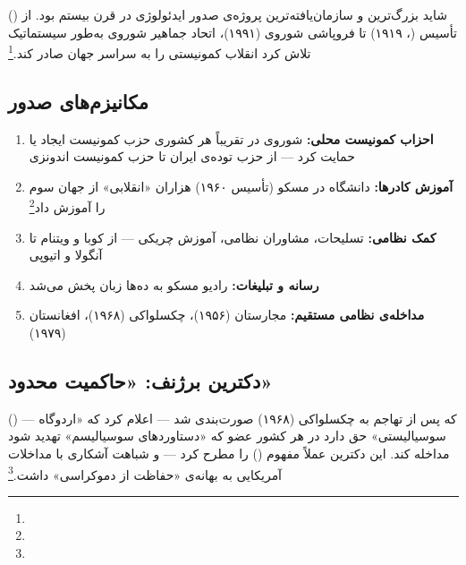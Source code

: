  () شاید بزرگ‌ترین و سازمان‌یافته‌ترین پروژه‌ی صدور ایدئولوژی در قرن بیستم بود. از تأسیس  (، ۱۹۱۹) تا فروپاشی شوروی (۱۹۹۱)، اتحاد جماهیر شوروی به‌طور سیستماتیک تلاش کرد انقلاب کمونیستی را به سراسر جهان صادر کند.\footnote{}

\subsection{مکانیزم‌های صدور}
\label{subsec:ch13-communism-mechanisms}

\begin{enumerate}
\item \textbf{احزاب کمونیست محلی:} شوروی در تقریباً هر کشوری حزب کمونیست ایجاد یا حمایت کرد — از حزب توده‌ی ایران تا حزب کمونیست اندونزی
\item \textbf{آموزش کادرها:} دانشگاه  در مسکو (تأسیس ۱۹۶۰) هزاران «انقلابی» از جهان سوم را آموزش داد\footnote{}
\item \textbf{کمک نظامی:} تسلیحات، مشاوران نظامی، آموزش چریکی — از کوبا و ویتنام تا آنگولا و اتیوپی
\item \textbf{رسانه و تبلیغات:} رادیو مسکو به ده‌ها زبان پخش می‌شد
\item \textbf{مداخله‌ی نظامی مستقیم:} مجارستان (۱۹۵۶)، چکسلواکی (۱۹۶۸)، افغانستان (۱۹۷۹)
\end{enumerate}

\subsection{دکترین برژنف: «حاکمیت محدود»}
\label{subsec:ch13-brezhnev}

 () — که پس از تهاجم به چکسلواکی (۱۹۶۸) صورت‌بندی شد — اعلام کرد که «اردوگاه سوسیالیستی» حق دارد در هر کشور عضو که «دستاوردهای سوسیالیسم» تهدید شود مداخله کند. این دکترین عملاً مفهوم  () را مطرح کرد — و شباهت آشکاری با مداخلات آمریکایی به بهانه‌ی «حفاظت از دموکراسی» داشت.\footnote{}

